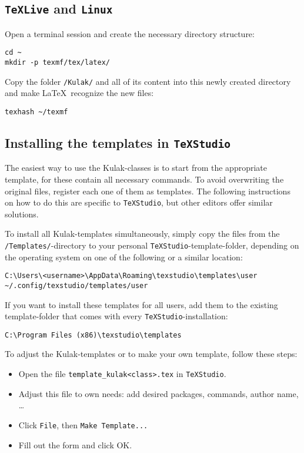 \documentclass[a4paper,kulak]{kulakarticle} %
\begin{document}
\subsection{\texttt{TeXLive} and \texttt{Linux}}

Open a terminal session and create the necessary directory structure:
\begin{verbatim}
cd ~
mkdir -p texmf/tex/latex/
\end{verbatim}
Copy the folder \texttt{/Kulak/} and all of its content into this newly created directory and make \LaTeX\ recognize the new files:
\begin{verbatim}
texhash ~/texmf
\end{verbatim}

\subsection{Installing the templates in \texttt{TeXStudio}}
\label{ssec:templates}

The easiest way to use the Kulak-classes is to start from the appropriate template, for these contain all necessary commands. To avoid overwriting the original files, register each one of them as templates. The following instructions on how to do this are specific to \texttt{TeXStudio}, but other editors offer similar solutions. 

To install all Kulak-templates simultaneously, simply copy the files from the \verb|/Templates/|-directory to your personal \texttt{TeXStudio}-template-folder, depending on the operating system on one of the following or a similar location:
\begin{verbatim}
C:\Users\<username>\AppData\Roaming\texstudio\templates\user
~/.config/texstudio/templates/user
\end{verbatim}

If you want to install these templates for all users, add them to the existing template-folder that comes with every \texttt{TeXStudio}-installation:

\begin{verbatim}
C:\Program Files (x86)\texstudio\templates
\end{verbatim}

To adjust the Kulak-templates or to make your own template, follow these steps:
\begin{itemize}
\item Open the file \verb+template_kulak<class>.tex+ in \texttt{TeXStudio}.
\item Adjust this file to own needs: add desired packages, commands, author name, \ldots
\item Click \texttt{File}, then \texttt{Make Template...}
\item Fill out the form and click OK.
\end{itemize}
\end{document}

